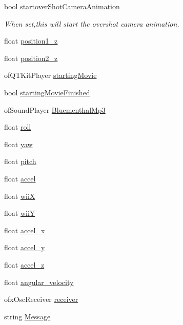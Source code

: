 \begin{DoxyCompactItemize}
\item 
bool \hyperlink{classtest_app_ad2fca6ce5e37462cd820afc48633324d}{startover\-Shot\-Camera\-Animation}
\begin{DoxyCompactList}\small\item\em When set,this will start the overshot camera animation. \end{DoxyCompactList}\item 
float \hyperlink{classtest_app_a808376783cdf510335cd1b37026e9bb3}{position1\-\_\-z}
\item 
float \hyperlink{classtest_app_a0720011cfaade6388109232ea4927c19}{position2\-\_\-z}
\item 
of\-Q\-T\-Kit\-Player \hyperlink{classtest_app_a9bfe7793fa0689a991ff64174745c38f}{starting\-Movie}
\item 
bool \hyperlink{classtest_app_aea3cb9f5f0061a42a4953d6b6c949036}{starting\-Movie\-Finished}
\item 
of\-Sound\-Player \hyperlink{classtest_app_af696fd13ee9ecb38ac0ba0b72543ce06}{Bluementhal\-Mp3}
\item 
float \hyperlink{classtest_app_a020730abb55e6ae6d0a28edee19050e0}{roll}
\item 
float \hyperlink{classtest_app_a865985f78dd5def3ed20c87b9fc772b6}{yaw}
\item 
float \hyperlink{classtest_app_aabbebeb113838374f659e86a0355b260}{pitch}
\item 
float \hyperlink{classtest_app_a8e560e923c82d421857538e4a5927542}{accel}
\item 
float \hyperlink{classtest_app_a7a77e8633c3a94e3e409a33a5cd9ae3f}{wii\-X}
\item 
float \hyperlink{classtest_app_a5ae41896388ae16ee530beca5333e02a}{wii\-Y}
\item 
float \hyperlink{classtest_app_ad1738ff98d225f80b853a9ddc9f5a116}{accel\-\_\-x}
\item 
float \hyperlink{classtest_app_a204bcb2412a70a65ebea6008ee8c4eb0}{accel\-\_\-y}
\item 
float \hyperlink{classtest_app_a61dbdd5c0b868568dde40a52f6e56054}{accel\-\_\-z}
\item 
float \hyperlink{classtest_app_a98e05c3206ff95fccfebfc9df5317598}{angular\-\_\-velocity}
\item 
ofx\-Osc\-Receiver \hyperlink{classtest_app_a034c44ff60fa1e5f021e90d5410ba657}{receiver}
\item 
string \hyperlink{classtest_app_a0124035d0454fb6bd9152f8a87c40677}{Message}
\item 

\end{DoxyCompactItemize}
